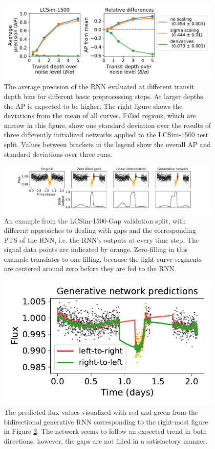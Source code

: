 \begin{figure}
    \centering
    \includegraphics[width=0.7\linewidth]{Experiments/Figures/Preprocessing/lcsim1500_AP_pp-basic.pdf}
    \caption{The average precision of the RNN evaluated at different transit depth bins for different basic preprocessing steps. At larger depths, the AP is expected to be higher. The right figure shows the deviations from the mean of all curves. Filled regions, which are narrow in this figure, show one standard deviation over the results of three differently initialized networks applied to the LCSim-1500 test split. Values between brackets in the legend show the overall AP and standard deviations over three runs.}
    \label{fig:lcsim_pp_basic}
\end{figure}

\begin{figure}
    \centering
    \includegraphics[width=\linewidth]{Experiments/Figures/Preprocessing/gap_examples.pdf}
    \caption{An example from the LCSim-1500-Gap validation split, with different approaches to dealing with gaps and the corresponding PTS of the RNN, i.e. the RNN's outputs at every time step. The signal data points are indicated by orange. Zero-filling in this example translates to one-filling, because the light curve segments are centered around zero before they are fed to the RNN.}
    \label{fig:gap_examples}
\end{figure}

\begin{figure}
    \centering
    \includegraphics[width=0.35\linewidth]{Experiments/Figures/Preprocessing/generative-rnn_predictions.pdf}
    \caption{The predicted flux values visualized with red and green from the bidirectional generative RNN corresponding to the right-most figure in Figure \ref{fig:gap_examples}. The network seems to follow an expected trend in both directions, however, the gaps are not filled in a satisfactory manner.}
    \label{fig:generative_preds}
\end{figure}

